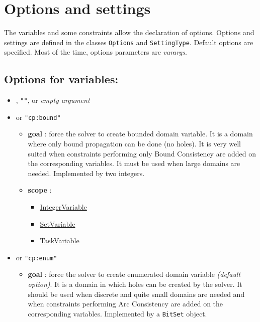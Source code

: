 \section{Options and settings}\label{optionssettings}\hypertarget{optionssettings}{}
The variables and some constraints allow the declaration of options. Options and settings are defined in the classes \texttt{Options} and \texttt{SettingType}. Default options are specified. Most of the time, options parameters are \textit{varargs}.

\subsection{Options for variables:}
	\begin{itemize}
		\item {}, \texttt{""}, or \textit{empty argument}
		\item \label{vbound:vboundoptions}\hypertarget{vbound:vboundoptions}{}
		 or \texttt{"cp:bound"}
		\begin{itemize}
				\item \textbf{goal} : force the solver to create bounded domain variable. It is a domain where only bound propagation can be done (no holes). It is very well suited when constraints performing only Bound Consistency are added on the corresponding variables. It must be used when large domains are needed. Implemented by two integers.
				\item \textbf{scope} : 
					\begin{itemize} 
						\item \hyperlink{integervariable}{IntegerVariable}
						\item \hyperlink{setvariable}{SetVariable}
						\item  \hyperlink{taskvariable}{TaskVariable}
					\end{itemize}
		\end{itemize}				
		\item \label{venum:venumoptions}\hypertarget{venum:venumoptions}{}
		 or \texttt{"cp:enum"}
		\begin{itemize}
				\item \textbf{goal} : force the solver to create enumerated domain variable \textit{(default option)}. It is a domain in which holes can be created by the solver. It should be used when discrete and quite small domains are needed and when constraints performing Arc Consistency are added on the corresponding variables. Implemented by a \texttt{BitSet} object.

\end{itemize}
\end{itemize}
